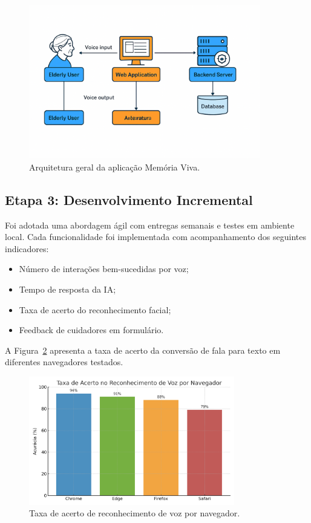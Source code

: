\begin{figure}[h]
\centering
\includegraphics[width=0.9\textwidth]{arquitetura-geral.png}
\caption{Arquitetura geral da aplicação Memória Viva.}
\label{fig:arquitetura}
\end{figure}

\subsection{Etapa 3: Desenvolvimento Incremental}

Foi adotada uma abordagem ágil com entregas semanais e testes em ambiente local. Cada funcionalidade foi implementada com acompanhamento dos seguintes indicadores:

\begin{itemize}
    \item Número de interações bem-sucedidas por voz;
    \item Tempo de resposta da IA;
    \item Taxa de acerto do reconhecimento facial;
    \item Feedback de cuidadores em formulário.
\end{itemize}

A Figura~\ref{fig:grafico-vozes} apresenta a taxa de acerto da conversão de fala para texto em diferentes navegadores testados.

\begin{figure}[h]
\centering
\includegraphics[width=0.8\textwidth]{grafico-voz-navegadores.png}
\caption{Taxa de acerto de reconhecimento de voz por navegador.}
\label{fig:grafico-vozes}
\end{figure}

